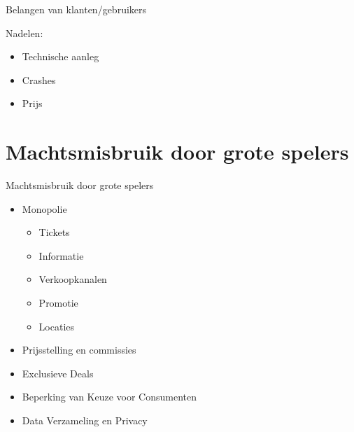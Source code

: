 \documentclass{beamer}
\begin{document}
\begin{frame}{Belangen van klanten/gebruikers}
    \LARGE{
        Nadelen:
        \begin{itemize}
            \item Technische aanleg
            \item Crashes
            \item Prijs
        \end{itemize}
    }
\end{frame}


\section[Machtsmisbruik]{Machtsmisbruik door grote spelers}
\begin{frame}{Machtsmisbruik door grote spelers}
    \begin{itemize}
        \item Monopolie
        \begin{itemize}
            \item Tickets
            \item Informatie
            \item Verkoopkanalen
            \item Promotie
            \item Locaties
        \end{itemize}
        \item Prijsstelling en commissies
        \item Exclusieve Deals
        \item Beperking van Keuze voor Consumenten
        \item Data Verzameling en Privacy
    \end{itemize}
\end{frame}
\end{document}

